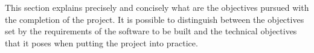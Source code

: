 
\nonzeroparskip This section explains precisely and concisely what are the objectives pursued with the completion of the project. It is possible to distinguish between the objectives set by the requirements of the software to be built and the technical objectives that it poses when putting the project into practice.

